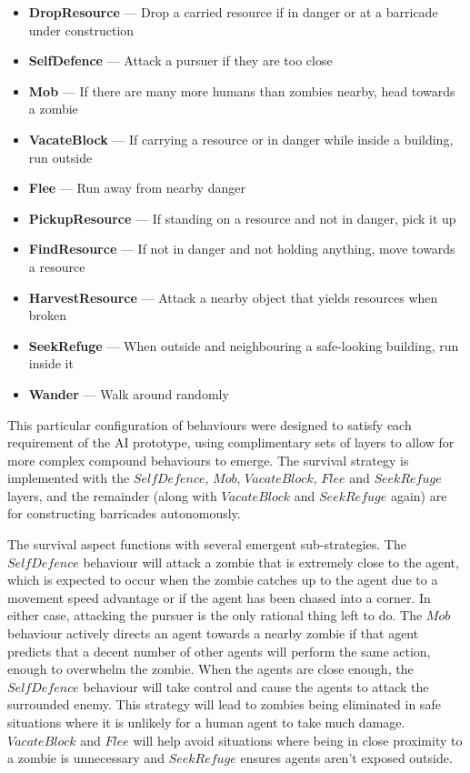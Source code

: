 \documentclass[a4paper,12pt]{article}
\newcommand{\layer}[2]{\item \textbf{#1} --- #2\vspace{-1mm}}
\begin{document}
\noindent
\small{
\begin{itemize}
\layer{DropResource}{Drop a carried resource if in danger or at a barricade under construction}
\layer{SelfDefence}{Attack a pursuer if they are too close}
\layer{Mob}{If there are many more humans than zombies nearby, head towards a zombie}
\layer{VacateBlock}{If carrying a resource or in danger while inside a building, run outside}
\layer{Flee}{Run away from nearby danger}
\layer{PickupResource}{If standing on a resource and not in danger, pick it up}
\layer{FindResource}{If not in danger and not holding anything, move towards a resource}
\layer{HarvestResource}{Attack a nearby object that yields resources when broken}
\layer{SeekRefuge}{When outside and neighbouring a safe-looking building, run inside it}
\layer{Wander}{Walk around randomly}
\end{itemize}}

This particular configuration of behaviours were designed to satisfy each requirement of the AI prototype, using complimentary sets of layers to allow for more complex compound behaviours to emerge. The survival strategy is implemented with the $SelfDefence$, $Mob$, $VacateBlock$, $Flee$ and $SeekRefuge$ layers, and the remainder (along with $VacateBlock$ and $SeekRefuge$ again) are for constructing barricades autonomously.

The survival aspect functions with several emergent sub-strategies. The $SelfDefence$ behaviour will attack a zombie that is extremely close to the agent, which is expected to occur when the zombie catches up to the agent due to a movement speed advantage or if the agent has been chased into a corner. In either case, attacking the pursuer is the only rational thing left to do. The $Mob$ behaviour actively directs an agent towards a nearby zombie if that agent predicts that a decent number of other agents will perform the same action, enough to overwhelm the zombie. When the agents are close enough, the $SelfDefence$ behaviour will take control and cause the agents to attack the surrounded enemy. This strategy will lead to zombies being eliminated in safe situations where it is unlikely for a human agent to take much damage. $VacateBlock$ and $Flee$ will help avoid situations where being in close proximity to a zombie is unnecessary and $SeekRefuge$ ensures agents aren't exposed outside.
\end{document}
